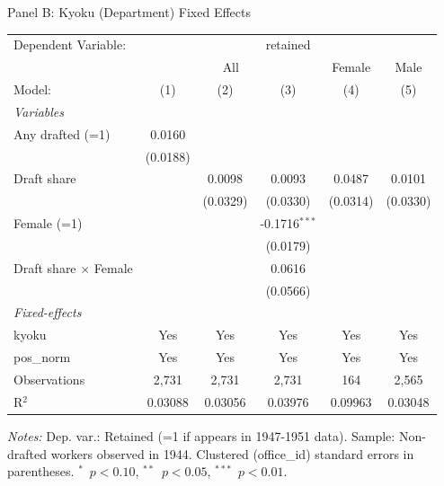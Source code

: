 \begin{table}[htbp]
\begin{threeparttable}
\par\endgroup
\vspace{2ex}
Panel B: Kyoku (Department) Fixed Effects\\[1ex]
\begingroup
\centering
\begin{tabular}{lccccc}
   \tabularnewline \midrule \midrule
   Dependent Variable: & \multicolumn{5}{c}{retained}\\
    & \multicolumn{3}{c}{All} & Female & Male \\ 
   Model:                       & (1)      & (2)      & (3)             & (4)      & (5)\\  
   \midrule
   \emph{Variables}\\
   Any drafted (=1)             & 0.0160   &          &                 &          &   \\   
                                & (0.0188) &          &                 &          &   \\   
   Draft share                  &          & 0.0098   & 0.0093          & 0.0487   & 0.0101\\   
                                &          & (0.0329) & (0.0330)        & (0.0314) & (0.0330)\\   
   Female (=1)                  &          &          & -0.1716$^{***}$ &          &   \\   
                                &          &          & (0.0179)        &          &   \\   
   Draft share $\times$ Female  &          &          & 0.0616          &          &   \\   
                                &          &          & (0.0566)        &          &   \\   
   \midrule
   \emph{Fixed-effects}\\
   kyoku                        & Yes      & Yes      & Yes             & Yes      & Yes\\  
   pos\_norm                    & Yes      & Yes      & Yes             & Yes      & Yes\\  
   \midrule
   Observations                 & 2,731    & 2,731    & 2,731           & 164      & 2,565\\  
   R$^2$                        & 0.03088  & 0.03056  & 0.03976         & 0.09963  & 0.03048\\  
   \midrule \midrule
\end{tabular}
\par\endgroup
\begin{tablenotes}[flushleft]
\footnotesize
\item \textit{Notes:} Dep. var.: Retained (=1 if appears in 1947-1951 data). Sample: Non-drafted workers observed in 1944. Clustered (office\_id) standard errors in parentheses. $^{*}$~$p<0.10$, $^{**}$~$p<0.05$, $^{***}$~$p<0.01$.
\end{tablenotes}
\end{threeparttable}
\end{table}

